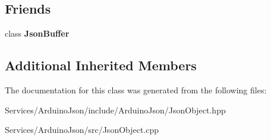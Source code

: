 \subsection*{Friends}
\begin{DoxyCompactItemize}
\item 
\hypertarget{class_arduino_json_1_1_json_object_a722362d1283cdffdf5309ff09cc998cd}{}class {\bfseries Json\+Buffer}\label{class_arduino_json_1_1_json_object_a722362d1283cdffdf5309ff09cc998cd}

\end{DoxyCompactItemize}
\subsection*{Additional Inherited Members}


The documentation for this class was generated from the following files\+:\begin{DoxyCompactItemize}
\item 
Services/\+Arduino\+Json/include/\+Arduino\+Json/Json\+Object.\+hpp\item 
Services/\+Arduino\+Json/src/Json\+Object.\+cpp\end{DoxyCompactItemize}

